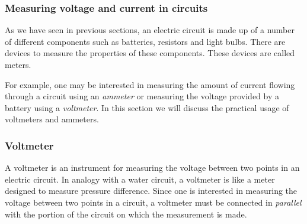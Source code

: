   

      


    \label{m38773*cid6}
            \subsubsection{ Measuring voltage and current in circuits}
            \nopagebreak
            
      
      \label{m38773*id67616}As we have seen in previous sections, an electric circuit is made
up of a number of different components such as batteries, resistors and
light bulbs. There are devices to measure the properties of these components.
These devices are called meters.\par 
      \label{m38773*id67622}For example, one may be interested in measuring the
amount of current flowing through a circuit using an \textsl{ammeter} or measuring the
voltage provided by a battery using a \textsl{voltmeter}. In this section we will discuss the
practical usage of voltmeters and ammeters.\par 
      \label{m38773*uid72}
            \subsubsection{ Voltmeter}
            \nopagebreak
            
        
        \label{m38773*id67653}A voltmeter is an instrument for measuring the voltage between two
points in an electric circuit. In analogy with a water circuit, a
voltmeter is like a meter designed to measure pressure difference.
Since one is interested in measuring the voltage between two
points in a circuit, a voltmeter must be connected in
\textsl{parallel} with the portion of the circuit on which the
measurement is made.\par 
        
    \setcounter{subfigure}{0}


